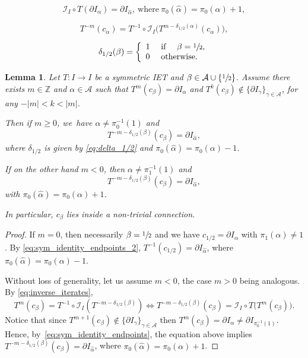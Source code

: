 \documentclass[10pt,a4paper]{article}
\theoremstyle{plain}
\newtheorem{lemma}[theorem]{Lemma}
\theoremstyle{definition}
\newcommand{\A}{\mathcal{A}}
\newcommand{\I}{\mathcal{I}}
\newcommand{\Z}{\mathbb{Z}}
\begin{document}
\begin{equation}
\label{eq:sym_identity_endpoints}
\I_I\circ T(\partial I_{\alpha})=\partial I_{\hat\alpha},\ \text{where}\ \pi_0(\hat\alpha)=\pi_0(\alpha)+1,
\end{equation}

\begin{equation}
\label{eq:inverse_iterates}
T^{-m}(c_\alpha) =
{T^{-1} \circ \I_I} \big( T^{m - \delta_{1/2}(\alpha)}(c_\alpha) \big),
\end{equation}

\begin{equation}
\label{eq:delta_1/2}
\delta_{1/2}(\beta) = \left\{\begin{array}{ll} 1 & \text{ if } \quad \beta = \sfrac{1}{2}, \\
0 & \text{ otherwise}.
\end{array} \right.
\end{equation}

\begin{lemma}
\label{lem:symmetric_connection}
Let $T: I \to I$ be a symmetric IET and $\beta \in \A \cup \{\sfrac{1}{2}\}$. Assume there exists $m \in \Z$ and $\alpha \in \A$ such that $T^m(c_\beta) = \partial I_\alpha$ and $T^k(c_\beta) \notin \{\partial I_\gamma\}_{\gamma \in \A}$, for any $-|m| < k < |m|$.

Then {if $m\ge 0$}, we~have $\alpha \neq \pi_0^{-1}(1)$ and\vspace*{-3pt}
\[
T^{-m - \delta_{1/2}(\beta)}(c_\beta) = \partial I_{\hat \alpha},
\]
where $\delta_{1/2}$ is given by \eqref{eq:delta_1/2} and $\pi_0( \hat \alpha) = \pi_0(\alpha) - 1$.

{If on the other hand $m<0$, then $\alpha\neq \pi_1^{-1}(1)$ and\vspace*{-3pt}
\[
T^{-m - \delta_{1/2}(\beta)}(c_\beta) = \partial I_{\hat \alpha},
\]
with $\pi_0( \hat \alpha) = \pi_0(\alpha) + 1$.
}

In particular, $c_\beta$ lies inside a non-trivial connection.
\end{lemma}

\begin{proof}

If $m = 0$, then necessarily $\beta = \sfrac{1}{2}$ and we have $c_{1/2} = \partial I_\alpha$ with $\pi_1(\alpha) \neq 1$. By \eqref{eq:sym_identity_endpoints_2}, $T^{-1}(c_{1/2}) = \partial I_{\hat \alpha}$, where $\pi_0( \hat \alpha) = \pi_0(\alpha) - 1$.

Without loss of generality, let us assume $m < 0$, the case $m > 0$ being analogous. By \eqref{eq:inverse_iterates},
\begin{equation*}
\label{eq:inverse_iterates_negative}
T^m(c_{\beta})=T^{-1}\circ \I_I(T^{-m-\delta_{1/2}(\beta)})\iff T^{-m- \delta_{1/2}(\beta) }(c_\beta) = \I_I\circ T \big( T^{m}(c_\beta)\big).
\end{equation*}
Notice that since $T^{m + 1}(c_\beta) \notin \{\partial I_\gamma\}_{\gamma \in \A}$ then $T^{m}(c_\beta) = \partial I_\alpha \neq \partial I_{\pi_0^{-1}(1)}$. Hence, by~\eqref{eq:sym_identity_endpoints}, the equation above implies $T^{-m - \delta_{1/2}(\beta)}(c_\beta) = \partial I_{\hat \alpha}$, where \hbox{$\pi_0( \hat \alpha) = \pi_0(\alpha) + 1$}.
\end{proof}
\end{document}
